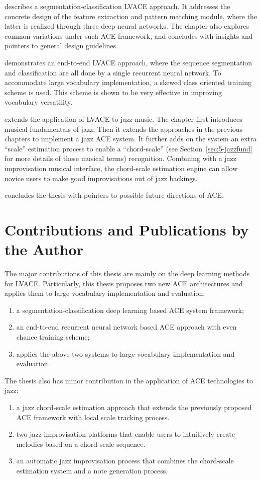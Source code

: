  describes a segmentation-classification LVACE approach. It addresses the concrete design of the feature extraction and pattern matching module, where the latter is realized through three deep neural networks. The chapter also explores common variations under such ACE framework, and concludes with insights and pointers to general design guidelines.

 demonstrates an end-to-end LVACE approach, where the sequence segmentation and classification are all done by a single recurrent neural network. To accommodate large vocabulary implementation, a skewed class oriented training scheme is used. This scheme is shown to be very effective in improving vocabulary versatility.

 extends the application of LVACE to jazz music. The chapter first introduces musical fundamentals of jazz. Then it extends the approaches in the previous chapters to implement a jazz ACE system. It further adds on the system an extra ``scale'' estimation process to enable a ``chord-scale'' (see Section~\ref{sec:5-jazzfund} for more details of these musical terms) recognition. Combining with a jazz improvisation musical interface, the chord-scale estimation engine can allow novice users to make good improvisations out of jazz backings.

 concludes the thesis with pointers to possible future directions of ACE.


\section{Contributions and Publications by the Author} \label{sec:1-contribution}
The major contributions of this thesis are mainly on the deep learning methods for LVACE. Particularly, this thesis proposes two new ACE architectures and applies them to large vocabulary implementation and evaluation:
\begin{enumerate}
\item a segmentation-classification deep learning based ACE system framework;
\item an end-to-end recurrent neural network based ACE approach with even chance training scheme;
\item applies the above two systems to large vocabulary implementation and evaluation.
\end{enumerate}

The thesis also has minor contribution in the application of ACE technologies to jazz:
\begin{enumerate}
\item a jazz chord-scale estimation approach that extends the previously proposed ACE framework with local scale tracking process.
\item two jazz improvisation platforms that enable users to intuitively create melodies based on a chord-scale sequence.
\item an automatic jazz improvisation process that combines the chord-scale estimation system and a note generation process.
\end{enumerate}

